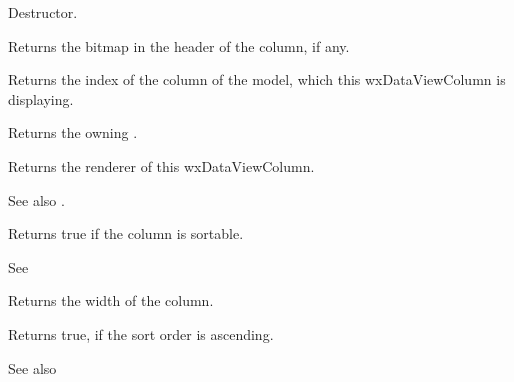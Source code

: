 
Destructor.

\label{wxdataviewcolumngetbitmap}


Returns the bitmap in the header of the column, if any.

\label{wxdataviewcolumngetmodelcolumn}


Returns the index of the column of the model, which this
wxDataViewColumn is displaying.

\label{wxdataviewcolumngetowner}


Returns the owning .

\label{wxdataviewcolumngetrenderer}


Returns the renderer of this wxDataViewColumn.

See also .

\label{wxdataviewcolumngetsortable}


Returns true if the column is sortable.

See 

\label{wxdataviewcolumngetwidth}


Returns the width of the column.

\label{wxdataviewcolumnissortorderascending}


Returns true, if the sort order is ascending.

See also 

\label{wxdataviewcolumnsetalignment}

